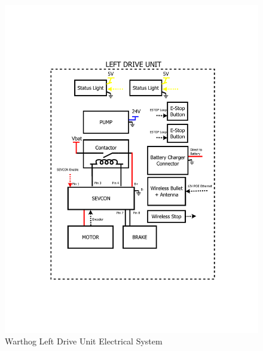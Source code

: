 \documentclass[]{clearpath-latex/clearpath-manual}
\begin{document}
\begin{figure}[!h]
  \centering
  \includegraphics[width=1.0\linewidth]{elec-left.pdf}
  \caption{Warthog Left Drive Unit Electrical System}
  \label{elec-left}
\end{figure}
\end{document}
